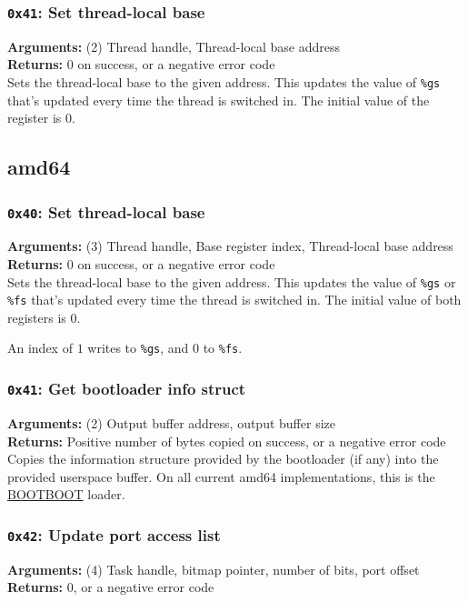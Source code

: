 \documentclass[11pt]{article}
\begin{document}
\subsubsection{{\tt 0x41}: Set thread-local base}
\textbf{Arguments:} (2) Thread handle, Thread-local base address \\
\textbf{Returns:} 0 on success, or a negative error code \\

Sets the thread-local base to the given address. This updates the value of \texttt{\%gs} that's updated every time the thread is switched in. The initial value of the register is 0.

\subsection{amd64}

\subsubsection{{\tt 0x40}: Set thread-local base}
\textbf{Arguments:} (3) Thread handle, Base register index, Thread-local base address \\
\textbf{Returns:} 0 on success, or a negative error code \\

Sets the thread-local base to the given address. This updates the value of \texttt{\%gs} or \texttt{\%fs} that's updated every time the thread is switched in. The initial value of both registers is 0.

An index of $1$ writes to \texttt{\%gs}, and $0$ to \texttt{\%fs}.

\subsubsection{{\tt 0x41}: Get bootloader info struct}
\textbf{Arguments:} (2) Output buffer address, output buffer size \\
\textbf{Returns:} Positive number of bytes copied on success, or a negative error code \\

Copies the information structure provided by the bootloader (if any) into the provided userspace buffer. On all current amd64 implementations, this is the \href{https://gitlab.com/bztsrc/bootboot/}{BOOTBOOT} loader.

\subsubsection{{\tt 0x42}: Update port access list}
\textbf{Arguments:} (4) Task handle, bitmap pointer, number of bits, port offset \\
\textbf{Returns:} 0, or a negative error code \\
\end{document}
